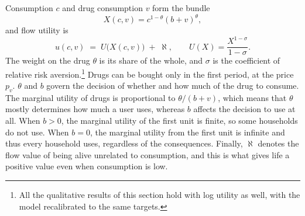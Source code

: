 \documentclass[10pt]{article}
\begin{document}
Consumption $c$ and drug consumption $v$ form the bundle
\begin{equation}\label{eq:bundles}
X(c,v)=c^{1-\theta}(b+v)^{\theta},
\end{equation}
and flow utility is
\begin{equation}\label{eq:u}
u(c,v) \;=\; U\big(X(c,v)\big)\;+\;\aleph,
\qquad U(X)=\frac{X^{1-\sigma}}{1-\sigma}.
\end{equation}
The weight on the
drug $\theta$ is its share of the whole, and $\sigma$ is the coefficient of relative
risk aversion.\footnote{All the qualitative results of this section hold with log utility as well, with the model recalibrated to the same targets.} Drugs can be bought only in the first period, at the price $p_v$.   $\theta$ and $b$ govern the decision of whether and how much of the drug to consume. The marginal utility of drugs is proportional to $\theta/(b+v)$, which means that $\theta$ mostly determines how much a user uses, whereas $b$ affects the decision to use at all. When $b>0$, the marginal utility of the first unit is finite, so some households do not use. When $b=0$, the marginal utility from the first unit is infinite and thus every household uses, regardless of the consequences. Finally, $\aleph$ denotes the flow value of being alive unrelated to consumption, and this is what gives life a positive value even when consumption is low.
\end{document}

